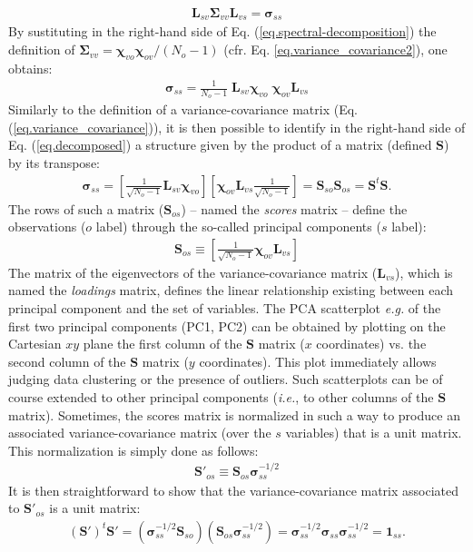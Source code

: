\documentclass[11pt]{amsart}
\begin{document}
%
\begin{eqnarray}
\label{eq.spectral-decomposition}
\bm L_{sv} \bm \Sigma_{vv} \bm L_{vs}
=
\bm \sigma_{ss}
\end{eqnarray}
%
By sustituting in the right-hand side of Eq. (\ref{eq.spectral-decomposition}) the definition of $\bm \Sigma_{vv} = \bm \chi_{vo} \bm \chi_{ov} / (N_o-1)$ (cfr. Eq. \ref{eq.variance_covariance2}), one obtains:
%
\begin{eqnarray}
\label{eq.decomposed}
\bm \sigma_{ss} =
\frac{1}{N_o - 1} \; \bm L_{sv} \bm \chi_{vo} \; \bm \chi_{ov} \bm L_{vs} 
\end{eqnarray}
%
Similarly to the definition of a variance-covariance matrix (Eq. (\ref{eq.variance_covariance})), it is then possible to identify in the right-hand side of Eq. (\ref{eq.decomposed}) a structure given by the product of a matrix (defined $\bm S$) by its transpose:
%
\begin{eqnarray}
\bm \sigma_{ss}
=
\left[ \frac{1}{\sqrt{N_o - 1}} \bm L_{sv} \bm \chi_{vo} \right]
\left[ \bm \chi_{ov} \bm L_{vs} \frac{1}{\sqrt{N_o - 1}} \right] 
=
\bm S_{so} \bm S_{os}
=
\bm S^t \bm S.
\end{eqnarray}
%
The rows of such a matrix ($\bm S_{os}$) -- named the {\em scores} matrix -- define the observations ($o$ label) through the so-called principal components ($s$ label):
%
\begin{eqnarray}
\label{eq.scores}
\bm S_{os} \equiv \left[ \frac{1}{\sqrt{N_o - 1}} \bm \chi_{ov} \bm L_{vs} \right]
\end{eqnarray}
%
The matrix of the eigenvectors of the variance-covariance matrix ($\bm L_{vs}$), which is named the {\em loadings} matrix, defines the linear relationship existing between each principal component and the set of variables.
%
The PCA scatterplot {\em e.g.} of the first two principal components (PC1, PC2) can be obtained by plotting on the Cartesian $xy$ plane the first column of the $\bm S$ matrix ($x$ coordinates) vs. the second column of the $\bm S$ matrix ($y$ coordinates). This plot immediately allows judging data clustering or the presence of outliers. Such scatterplots can be of course extended to other principal components ({\em i.e.}, to other columns of the $\bm S$ matrix).
Sometimes, the scores matrix is normalized in such a way to produce an associated variance-covariance matrix (over the $s$ variables) that is a unit matrix. This normalization is simply done as follows:
%
\begin{eqnarray}
\bm S'_{os} \equiv \bm S_{os} \bm \sigma_{ss}^{-1/2}
\end{eqnarray}
%
It is then straightforward to show that the variance-covariance matrix associated to $\bm S'_{os}$ is a unit matrix:
%
\begin{eqnarray}
(\bm S')^t \bm S' = 
%
\left( \bm \sigma_{ss}^{-1/2} \bm S_{so} \right) \left( \bm S_{os} \bm \sigma_{ss}^{-1/2} \right) =
%
\bm \sigma_{ss}^{-1/2} \bm \sigma_{ss} \bm \sigma_{ss}^{-1/2} = {\bm 1}_{ss}.
\end{eqnarray}


 

\end{document}

